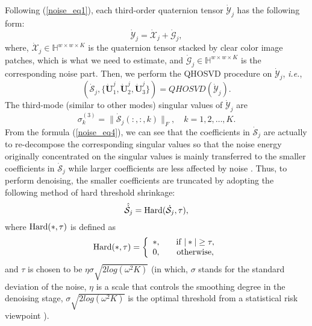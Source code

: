 \documentclass[journal]{IEEEtran}
\begin{document}
Following (\ref{noise_eq1}), each third-order quaternion tensor $\dot{\mathcal{Y}}_{j}$ has the following form:
\begin{equation}\label{noise_eq2}
\dot{\mathcal{Y}}_{j}=\dot{\mathcal{X}}_{j}+\dot{\mathcal{G}}_{j},
\end{equation}
where, $\dot{\mathcal{X}}_{j}\in\mathbb{H}^{w\times w \times K}$ is the quaternion tensor stacked by clear color image patches, which is what we need to estimate, and $\dot{\mathcal{G}}_{j}\in\mathbb{H}^{w\times w \times K}$ is the corresponding noise part. Then, we perform the QHOSVD procedure on $\dot{\mathcal{Y}}_{j}$, \emph{i.e.},
\begin{equation}\label{noise_eq3}
(\dot{\mathcal{S}}_{j}, \{\dot{\mathbf{U}}_{1}^{j},\dot{\mathbf{U}}_{2}^{j},\dot{\mathbf{U}}_{3}^{j}\})=QHOSVD(\dot{\mathcal{Y}}_{j}).
\end{equation}
The third-mode (similar to other modes) singular values of $\dot{\mathcal{Y}}_{j}$ are
\begin{equation}\label{noise_eq4}
\sigma_{k}^{(3)}=\|\dot{\mathcal{S}}_{j}(:,:,k)\|_{F}, \quad k=1,2,\ldots, K.
\end{equation}
From the formula (\ref{noise_eq4}), we can see that the coefficients in $\dot{\mathcal{S}}_{j}$ are actually to re-decompose the corresponding singular values so that the noise energy originally concentrated on the singular values is mainly transferred to the smaller coefficients in $\dot{\mathcal{S}}_{j}$ while larger coefficients are less affected by noise \cite{DBLP:journals/access/GaoGZCZ19}. Thus, to perform denoising, the smaller coefficients are truncated by adopting the following method of hard threshold shrinkage:
\begin{equation}\label{noise_eq5}
\hat{\dot{\mathcal{S}}}_{j}={\rm{Hard}}(\dot{\mathcal{S}}_{j},\tau),
\end{equation}
where $\rm{Hard}(\ast,\tau)$ is defined as
\begin{align}
\rm{Hard}(\ast,\tau)=\left\{
\begin{array}{lc}
\ast, \quad &\text{if} \ |\ast|\geq \tau,\\
0, &\text{otherwise},
\end{array}
\right.
\end{align}
and $\tau$ is chosen to be $\eta\sigma\sqrt{2log(\omega^{2}K)}$ (in which, $\sigma$ stands for the standard deviation of the noise,  $\eta$ is a scale that controls the smoothing degree in the denoising stage, $\sigma\sqrt{2log(\omega^{2}K)}$ is the optimal threshold from a statistical risk viewpoint \cite{1994Ideal}).
\end{document}
